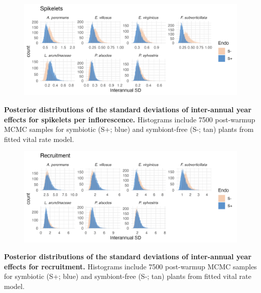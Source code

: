 \documentclass[12pt]{article}
\begin{document}
\begin{figure}[H]
	\centering
	\includegraphics[width=.9\linewidth]{spike_sigmayear_hist.png}
\end{figure}
 \textbf{Posterior distributions of the standard deviations of inter-annual year effects for spikelets per inflorescence.} Histograms include 7500 post-warmup MCMC samples for symbiotic (S+; blue) and symbiont-free (S-; tan) plants from fitted vital rate model.


\begin{figure}[H]
	\centering
	\includegraphics[width=.9\linewidth]{recruit_sigmayear_hist.png}
\end{figure}
 \textbf{Posterior distributions of the standard deviations of inter-annual year effects for recruitment.} Histograms include 7500 post-warmup MCMC samples for symbiotic (S+; blue) and symbiont-free (S-; tan) plants from fitted vital rate model.

\newpage
\end{document}
